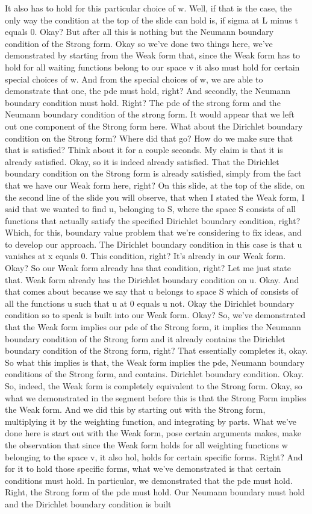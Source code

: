 \documentclass[10pt]{article}
\begin{document}
It also has to hold for this particular choice of w. Well, if that is the case, the only way the condition at the top of the slide can hold is, if sigma at L minus t equals 0. Okay? But after all this is nothing but the Neumann boundary condition of the Strong form. Okay so we've done two things here, we've demonstrated by starting from the Weak form that, since the Weak form has to hold for all waiting functions belong to our space v it also must hold for certain special choices of w. And from the special choices of w, we are able to demonstrate that one, the pde must hold, right? And secondly, the Neumann boundary condition must hold. Right? The pde of the strong form and the Neumann boundary condition of the strong form. It would appear that we left out one component of the Strong form here. What about the Dirichlet boundary condition on the Strong form? Where did that go? How do we make sure that that is satisfied? Think about it for a couple seconds. My claim is that it is already satisfied. Okay, so it is indeed already satisfied. That the Dirichlet boundary condition on the Strong form is already satisfied, simply from the fact that we have our Weak form here, right? On this slide, at the top of the slide, on the second line of the slide you will observe, that when I stated the Weak form, I said that we wanted to find u, belonging to S, where the space S consists of all functions that actually satisfy the specified Dirichlet boundary condition, right? Which, for this, boundary value problem that we're considering to fix ideas, and to develop our approach. The Dirichlet boundary condition in this case is that u vanishes at x equals 0. This condition, right? It's already in our Weak form. Okay? So our Weak form already has that condition, right? Let me just state that. Weak form already has the Dirichlet boundary condition on u. Okay. And that comes about because we say that u belongs to space S which of consists of all the functions u such that u at 0 equals u not. Okay the Dirichlet boundary condition so to speak is built into our Weak form. Okay? So, we've demonstrated that the Weak form implies our pde of the Strong form, it implies the Neumann boundary condition of the Strong form and it already contains the Dirichlet boundary condition of the Strong form, right? That essentially completes it, okay. So what this implies is that, the Weak form implies the pde, Neumann boundary conditions of the Strong form, and contains. Dirichlet boundary condition. Okay. So, indeed, the Weak form is completely equivalent to the Strong form. Okay, so what we demonstrated in the segment before this is that the Strong Form implies the Weak form. And we did this by starting out with the Strong form, multiplying it by the weighting function, and integrating by parts. What we've done here is start out with the Weak form, pose certain arguments makes, make the observation that since the Weak form holds for all weighting functions w belonging to the space v, it also hol, holds for certain specific forms. Right? And for it to hold those specific forms, what we've demonstrated is that certain conditions must hold. In particular, we demonstrated that the pde must hold. Right, the Strong form of the pde must hold. Our Neumann boundary must hold and the Dirichlet boundary condition is built 
\end{document}
